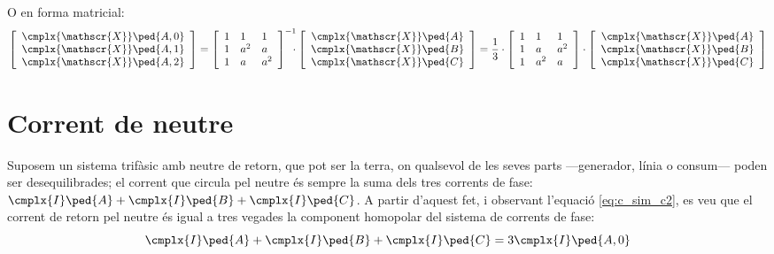 O en forma matricial:
\begin{equation}\label{eq:c_sim_mat1}
   \begin{bmatrix}\begin{array}{c}
     \cmplx{\mathscr{X}}\ped{A,0} \\
     \cmplx{\mathscr{X}}\ped{A,1} \\
     \cmplx{\mathscr{X}}\ped{A,2}
    \end{array}\end{bmatrix} =
   \begin{bmatrix}\begin{array}{lll}
     1 & 1 & 1 \\
     1 & a^2 & a\\
     1 & a & a^2
   \end{array}\end{bmatrix}^{-1} \hspace{-2mm}\cdot
   \begin{bmatrix}\begin{array}{c}
     \cmplx{\mathscr{X}}\ped{A} \\
     \cmplx{\mathscr{X}}\ped{B} \\
     \cmplx{\mathscr{X}}\ped{C}
   \end{array}\end{bmatrix} =  \frac{1}{3} \cdot
   \begin{bmatrix}\begin{array}{lll}
     1 & 1 & 1 \\
     1 & a & a^2 \\
     1 & a^2 & a
   \end{array}\end{bmatrix} \cdot
   \begin{bmatrix}\begin{array}{c}
     \cmplx{\mathscr{X}}\ped{A} \\
     \cmplx{\mathscr{X}}\ped{B} \\
     \cmplx{\mathscr{X}}\ped{C}
   \end{array}\end{bmatrix}
\end{equation}

\section{Corrent de neutre}\label{sec:corrent-neutre}

Suposem un sistema trifàsic amb neutre de retorn, que pot ser la
terra, on qualsevol de les seves parts ---generador, línia o consum---
poden ser desequilibrades; el corrent que circula pel neutre és
sempre la suma dels tres corrents de fase: $\cmplx{I}\ped{A}+
\cmplx{I}\ped{B}+\cmplx{I}\ped{C}$. A partir d'aquest fet, i
observant l'equació \eqref{eq:c_sim_c2}, es veu que el corrent de
retorn pel neutre és igual a tres vegades la component homopolar
del sistema de corrents de fase:
\begin{equation}
    \cmplx{I}\ped{A}+\cmplx{I}\ped{B}+\cmplx{I}\ped{C} =3 \cmplx{I}\ped{A,0}
\end{equation}

